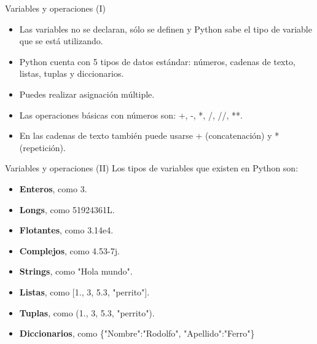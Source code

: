 \documentclass[usenames,dvipsnames]{beamer}
\begin{document}
  \begin{frame}{Variables y operaciones (I)}
    \begin{itemize}
      \item Las variables no se declaran, sólo se definen y Python sabe el
      tipo de variable que se está utilizando.
      \item Python cuenta con 5 tipos de datos estándar: números, cadenas
      de texto, listas, tuplas y diccionarios.
      \item Puedes realizar asignación múltiple.
      \item Las operaciones básicas con números son: +, -, *, /, //, **.
      \item En las cadenas de texto también puede usarse + (concatenación)
      y * (repetición).
    \end{itemize}
  \end{frame}

  \begin{frame}{Variables y operaciones (II)}
    Los tipos de variables que existen en Python son:
    \begin{itemize}
      \item \textbf{Enteros}, como 3.
      \item \textbf{Longs}, como 51924361L.
      \item \textbf{Flotantes}, como 3.14e4.
      \item \textbf{Complejos}, como 4.53-7j.
      \item \textbf{Strings}, como "Hola mundo".
      \item \textbf{Listas}, como [1., 3, 5.3, "perrito"].
      \item \textbf{Tuplas}, como (1., 3, 5.3, "perrito").
      \item \textbf{Diccionarios}, como \{"Nombre":"Rodolfo", "Apellido":"Ferro"\}
    \end{itemize}
  \end{frame}
\end{document}
